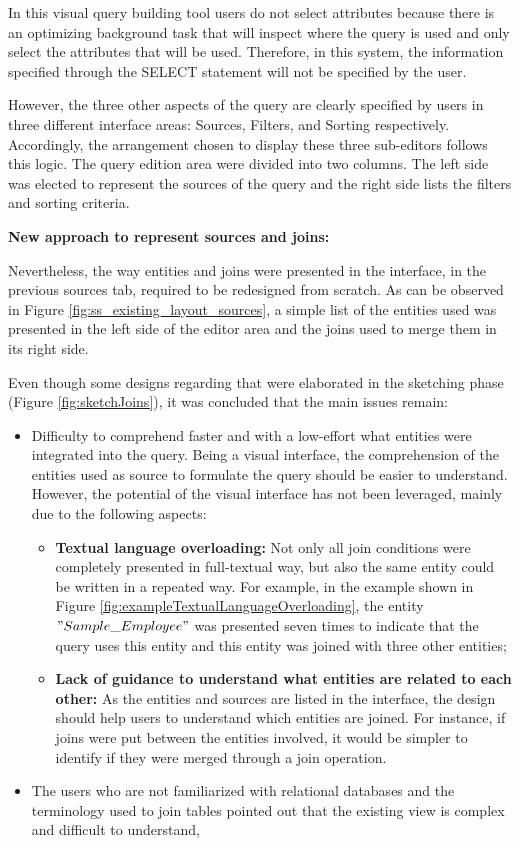 In this visual query building tool users do not select attributes because there is an optimizing background task that will inspect where the query is used and only select the attributes that will be used. Therefore, in this system, the information specified through the SELECT statement will not be specified by the user.

However, the three other aspects of the query are clearly specified by users in three different interface areas: Sources, Filters, and Sorting respectively. Accordingly, the arrangement chosen to display these three sub-editors follows this logic. The query edition area were divided into two columns. The left side was elected to represent the sources of the query and the right side lists the filters and sorting criteria.

\medskip

\textbf{New approach to represent sources and joins:}

\medskip

Nevertheless, the way entities and joins were presented in the interface, in the previous sources tab, required to be redesigned from scratch. As can be observed in Figure \ref{fig:ss_existing_layout_sources}, a simple list of the entities used was presented in the left side of the editor area and the joins used to merge them in its right side.

Even though some designs regarding that were elaborated in the sketching phase (Figure \ref{fig:sketchJoins}), it was concluded that the main issues remain:

\begin{itemize}
  \item Difficulty to comprehend faster and with a low-effort what entities were integrated into the query. Being a visual interface, the comprehension of the entities used as source to formulate the query should be easier to understand. However, the potential of the visual interface has not been leveraged, mainly due to the following aspects:
  \begin{itemize} 
    \item \textbf{Textual language overloading: }Not only all join conditions were completely presented in full-textual way, but also the same entity could be written in a repeated way. For example, in the example shown in Figure \ref{fig:exampleTextualLanguageOverloading}, the entity $"Sample\_Employee"$ was presented seven times to indicate that the query uses this entity and this entity was joined with three other entities;
    \item \textbf{Lack of guidance to understand what entities are related to each other: }As the entities and sources are listed in the interface, the design should help users to understand which entities are joined. For instance, if joins were put between the entities involved, it would be simpler to identify if they were merged through a join operation.
  \end{itemize}
  \item The users who are not familiarized with relational databases and the terminology used to join tables pointed out that the existing view is complex and difficult to understand,
\end{itemize}

